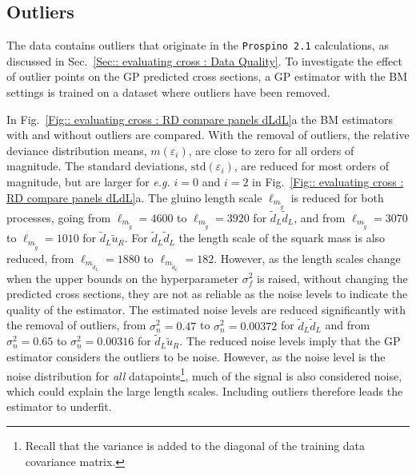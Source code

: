 \documentclass[twoside,english]{uiofysmaster}
\begin{document}
{{%

\subsection{Outliers}\label{Sec:: evaluating cross : Outliers}


The data contains outliers that originate in the \verb|Prospino 2.1| calculations, as discussed in Sec.~\ref{Sec:: evaluating cross : Data Quality}. To investigate the effect of outlier points on the GP predicted cross sections, a GP estimator with the BM settings is trained on a dataset where outliers have been removed. 

In Fig.~\ref{Fig:: evaluating cross : RD compare panels dLdL}a the BM estimators with and without outliers are compared. With the removal of outliers, the relative deviance distribution means, $m(\varepsilon_i)$, are close to zero for all orders of magnitude. The standard deviations, $\mathrm{std}(\varepsilon_i)$, are reduced for most orders of magnitude, but are larger for \textit{e.g.} $i=0$ and $i=2$ in Fig.~\ref{Fig:: evaluating cross : RD compare panels dLdL}a. The gluino length scale $\ell_{m_{\widetilde{g}}}$ is reduced for both processes, going from $\ell_{m_{\widetilde{g}}} = 4600$ to $\ell_{m_{\widetilde{g}}} = 3920$ for $\widetilde{d}_L \widetilde{d}_L$, and from $\ell_{m_{\widetilde{g}}} = 3070$ to $\ell_{m_{\widetilde{g}}}=1010$ for $\widetilde{d}_L \widetilde{u}_R$. For $\widetilde{d}_L \widetilde{d}_L$ the length scale of the squark mass is also reduced, from $\ell_{m_{\widetilde{d}_L}}=1880$ to $\ell_{m_{\widetilde{d}_L}}=182$. However, as the length scales change when the upper bounds on the hyperparameter $\sigma_f^2$ is raised, without changing the predicted cross sections, they are not as reliable as the noise levels to indicate the quality of the estimator. The estimated noise levels are reduced significantly with the removal of outliers, from $\sigma_n^2 = 0.47$ to $\sigma_n^2 = 0.00372$ for $\widetilde{d}_L \widetilde{d}_L$ and from $\sigma_n^2 = 0.65$ to $\sigma_n^2= 0.00316$ for $\widetilde{d}_L \widetilde{u}_R$. The reduced noise levels imply that the GP estimator considers the outliers to be noise. However, as the noise level is the noise distribution for \textit{all} datapoints\footnote{Recall that the variance is added to the diagonal of the training data covariance matrix.}, much of the signal is also considered noise, which could explain the large length scales. Including outliers therefore leads the estimator to underfit.   


}}
\end{document}
